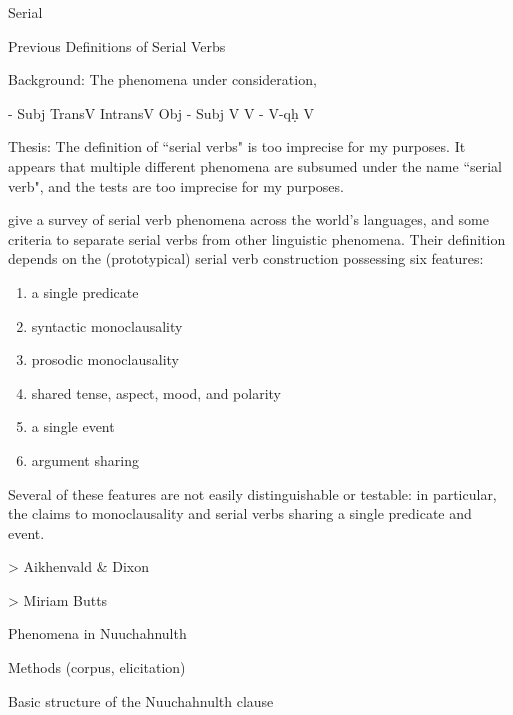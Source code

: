 Serial 

Previous Definitions of Serial Verbs

Background: The phenomena under consideration,

- Subj TransV IntransV Obj
- Subj V V
- V-qḥ V

Thesis: The definition of ``serial verbs" is too imprecise for my purposes. It appears that multiple different phenomena are subsumed under the name ``serial verb", and the tests are too imprecise for my purposes.

\cite{aikhenvalddixon2006} give a survey of serial verb phenomena across the world's languages, and some criteria to separate serial verbs from other linguistic phenomena. Their definition depends on the (prototypical) serial verb construction possessing six features:

\begin{enumerate}
\item a single predicate
\item syntactic monoclausality
\item prosodic monoclausality
\item shared tense, aspect, mood, and polarity
\item a single event
\item argument sharing
\end{enumerate}

Several of these features are not easily distinguishable or testable: in particular, the claims to monoclausality and serial verbs sharing a single predicate and event.


> Aikhenvald \& Dixon

> Miriam Butts

Phenomena in Nuuchahnulth

Methods (corpus, elicitation)

Basic structure of the Nuuchahnulth clause